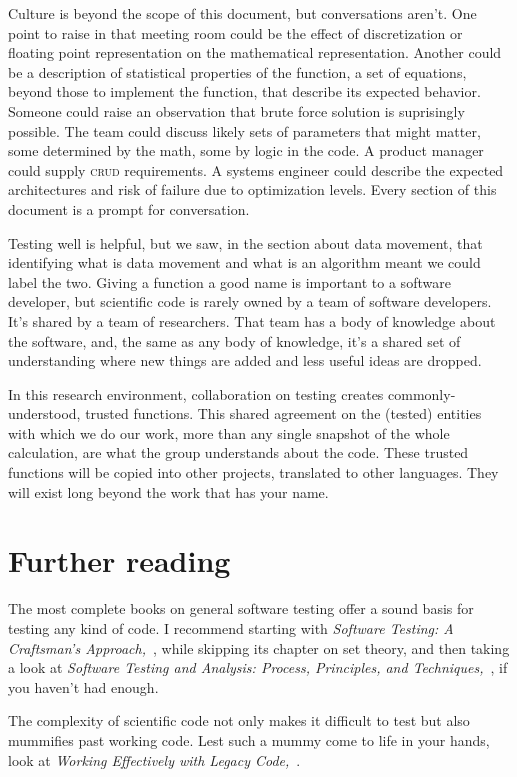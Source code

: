 \documentclass[fleqn,10pt]{olplainarticle}
\begin{document}
Culture is beyond the scope of this document, but conversations
aren't. One point to raise in that meeting room could
be the effect of discretization or floating point representation
on the mathematical representation. Another could be a
description of statistical properties of the function, a set
of equations, beyond those to implement the function, that
describe its expected behavior. Someone could raise an observation
that brute force solution is suprisingly possible.
The team could discuss likely sets of parameters that might
matter, some determined by the math, some by logic in the
code. A product manager could supply \textsc{crud} requirements.
A systems engineer could describe the expected architectures
and risk of failure due to optimization levels. Every section
of this document is a prompt for conversation.

Testing well is helpful, but we saw, in the section about
data movement, that identifying what is data movement
and what is an algorithm meant we could label the two.
Giving a function a good name is important to a software
developer, but scientific code is rarely owned by a team
of software developers. It's shared by a team of researchers.
That team has a body of knowledge about the software, and,
the same as any body of knowledge, it's a shared set of
understanding where new things are added and less useful
ideas are dropped.

In this research environment, collaboration on testing
creates commonly-understood, trusted functions. This shared
agreement on the (tested) entities with which we do our work, more
than any single snapshot of the whole calculation, are
what the group understands about the code. These trusted
functions will be copied into other projects, translated
to other languages. They will exist long beyond the work
that has your name.

\section{Further reading}\label{sec:further-reading}

The most complete books on general software testing offer a sound
basis for testing any kind of code. I recommend starting with
\emph{Software Testing: A Craftsman's Approach,}~\citep{jorgensen2013},
while skipping its chapter on set theory, and then taking a look at
\emph{Software Testing and Analysis: Process, Principles, and Techniques,}~\citep{pezze2008},
if you haven't had enough.

The complexity of scientific code not only makes it difficult
to test but also mummifies past working code. Lest such a mummy
come to life in your hands, look at \emph{Working Effectively with Legacy Code,}~\citep{feathers2004working}.
\end{document}
